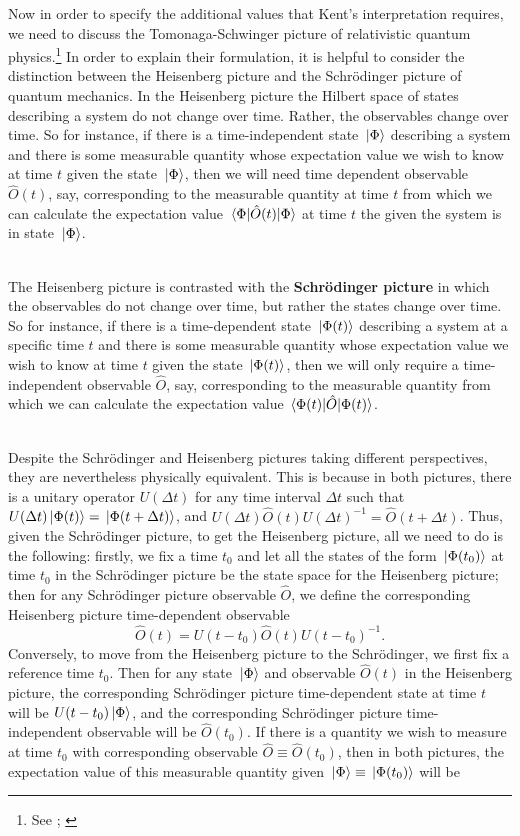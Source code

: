 Now in order to specify the additional values that Kent's interpretation requires, we need to discuss the Tomonaga-Schwinger picture of relativistic quantum physics.\footnote{See \cite{SchwingerJulianI}; \cite{TomonagaI}} In order to explain their formulation, it is helpful to consider the distinction between the Heisenberg picture and the Schr\"{o}dinger picture of quantum mechanics. In the Heisenberg picture the Hilbert space of states describing a system do not change over time. Rather, the observables change over time. So for instance, if there is a time-independent state $\ket*{\Phi}$ describing a system and there is some measurable quantity whose expectation value we wish to know at time $t$ given the state $\ket*{\Phi}$, then we will need time dependent observable $\hat{O}(t)$, say, corresponding to the measurable quantity at time $t$ from which we can calculate the expectation value $\ev*{\hat{O}(t)}{\Phi}$ at time $t$ the given the system is in state $\ket*{\Phi}$.\strut \\[\baselineskip]
The Heisenberg picture is contrasted with the \textbf{Schr\"{o}dinger picture} in which the observables do not change over time, but rather the states change over time. So for instance, if there is a time-dependent state $\ket*{\Phi(t)}$ describing a system at a specific time $t$ and there is some measurable quantity whose expectation value we wish to know at time $t$ given the state $\ket*{\Phi(t)}$, then we will only require a time-independent observable $\hat{O}$, say, corresponding to the measurable quantity from which we can calculate the expectation value $\ev*{\hat{O}}{\Phi(t)}$.\strut \\[\baselineskip] 
Despite the Schr\"{o}dinger and Heisenberg pictures taking different perspectives, they are nevertheless physically equivalent. This is because in both pictures, there is a unitary operator $U(\Delta t)$ for any time interval $\Delta t$ such that $U(\Delta t)\ket*{\Phi(t)}=\ket*{\Phi(t+\Delta t)}$, and $U(\Delta t)\hat{O}(t)U(\Delta t)^{-1}=\hat{O}(t+\Delta t)$. Thus, given the Schr\"{o}dinger picture, to get the Heisenberg picture, all we need to do is the following: firstly, we fix a time $t_0$ and let all the states of the form $\ket*{\Phi(t_0)}$ at time $t_0$ in the Schr\"{o}dinger picture be the state space for the Heisenberg picture; then for any Schr\"{o}dinger picture observable $\hat{O}$, we define the corresponding Heisenberg picture time-dependent observable 
$$\hat{O}(t)=U(t-t_0)\hat{O}(t)U(t-t_0)^{-1}.$$ 
Conversely, to move from the Heisenberg picture to the Schr\"{o}dinger, we first fix a reference time $t_0$. Then for any state $\ket*{\Phi}$ and observable $\hat{O}(t)$ in the Heisenberg picture, the corresponding Schr\"{o}dinger picture time-dependent state at time $t$ will be $U(t-t_0)\ket*{\Phi}$, and the corresponding Schr\"{o}dinger picture time-independent observable will be $\hat{O}(t_0)$. If there is a quantity we wish to measure at time $t_0$ with corresponding observable $\hat{O}\equiv\hat{O}(t_0)$, then in both pictures, the expectation value of this measurable quantity given $\ket*{\Phi}\equiv\ket*{\Phi(t_0)}$ will be 
